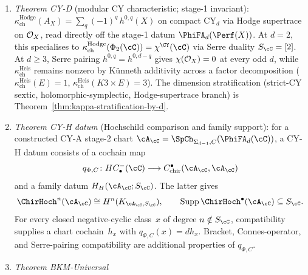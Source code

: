 \begin{enumerate}[label=\textup{(P\arabic*)},leftmargin=2em,
 topsep=0.3ex,itemsep=0.4ex]
 the stage-2 shadow
 $\SpCh_{K3, E}(\PhiFA_3(D^b\Coh(K3\times E)))$. The universal
 object is the pentagon colimit over five named intertwiners
 $\beta_{13}, \beta_{34}, \beta_{45}, \beta_{56}, \beta_{61}$
	 (Proposition~\ref{prop:cy-c-pentagon-colimit}); the generic
	 statement $\Rep(G(X)) \simeq \cZ(\Rep^{\Eone}(\Phi_3(\cC)))$
	 is the centre form of the theorem on the constructed locus. The abelian level
 $C(\fg, q) = D(Y^+(\fg_{K3}))$ is constructive;
	 the orthogonal Yangian $Y_\hbar(\mathfrak{so}(4, 20))$ is
	 the BKM-to-Yangian lift at the Mukai self-mirror branch. The Mukai form is
 symmetric indefinite of signature $(4, 20)$, symmetric on both
 even and odd parts, so the structure-preserving Lie algebra is
 $\mathfrak{so}(4, 20)$; Kac's $\osp(4 \mid 20)$ is not the
 envelope because $\osp$ requires a symplectic form on the odd
 part.
 \item \emph{Theorem CY-D} (modular CY characteristic;
 stage-1 invariant):
 $\kappa_{\mathrm{ch}}^{\mathrm{Hodge}}(A_X) = \sum_q (-1)^q\, h^{0, q}(X)$ on
 compact CY$_d$ via Hodge supertrace on $\mathcal{O}_X$, read directly
 off the stage-1 datum $\PhiFA_d(\Perf(X))$. At $d = 2$, this
 specialises to $\kappa_{\mathrm{ch}}^{\mathrm{Hodge}}(\Phi_2(\cC)) =
 \chi^{\CY}(\cC)$ via Serre duality $S_\cC = [2]$. At
 $d \geq 3$, Serre pairing $h^{0,q} = h^{0,d-q}$ gives
 $\chi(\mathcal{O}_X) = 0$ at every odd $d$, while
 $\kappa_{\mathrm{ch}}^{\mathrm{Heis}}$ remains nonzero by
 K\"unneth additivity across a factor decomposition
 ($\kappa_{\mathrm{ch}}^{\mathrm{Heis}}(E) = 1$,
 $\kappa_{\mathrm{ch}}^{\mathrm{Heis}}(K3 \times E) = 3$). The
 dimension stratification (strict-CY sextic,
 holomorphic-symplectic, Hodge-supertrace branch) is
 Theorem~\ref{thm:kappa-stratification-by-d}.
 \item \emph{Theorem CY-H datum} (Hochschild comparison and family support):
 \label{thm:cy-h-hochschild-comparison}
 for a constructed CY-A stage-$2$ chart
 $\cA_\cC=\SpCh_{\Sigma_{d-1},C}(\PhiFA_d(\cC))$, a CY-H datum
 consists of a cochain map
 \[
 q_{\Phi,C}\colon HC^-_\bullet(\cC)
 \longrightarrow
 C^\bullet_{\mathrm{chir}}(\cA_\cC,\cA_\cC)
 \]
 and a family datum $H_H(\cA_\cC;S_\cC)$.  The latter gives
 \[
 \ChirHoch^n(\cA_\cC)\cong H^n(K_{\cA_\cC,S_\cC}),
 \qquad
 \operatorname{Supp}\ChirHoch^\bullet(\cA_\cC)\subseteq S_\cC.
 \]
 For every closed negative-cyclic class~$x$ of degree
 $n\notin S_\cC$, compatibility supplies a chart cochain~$h_x$ with
 $q_{\Phi,C}(x)=dh_x$.  Bracket, Connes-operator, and Serre-pairing
 compatibility are additional properties of $q_{\Phi,C}$.
 \item \emph{Theorem BKM-Universal}

\end{enumerate}
